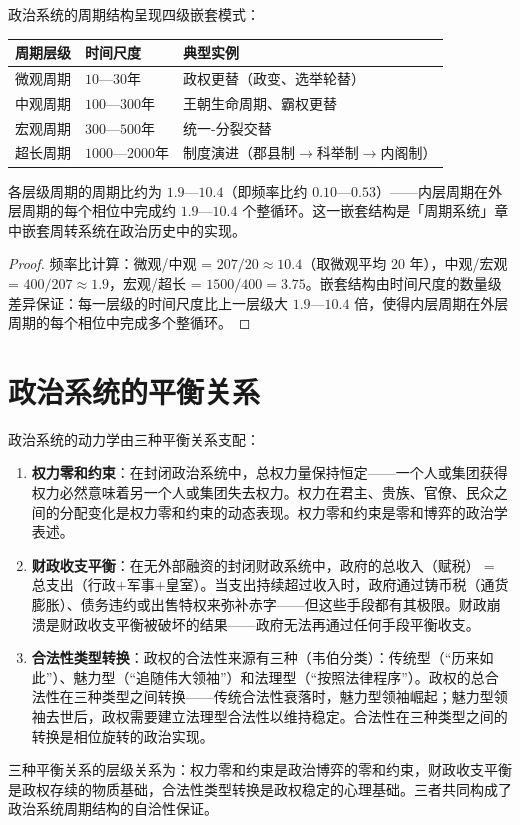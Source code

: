 \begin{theorem}[政治系统的嵌套周期结构]\label{thm:politics_nested_periods}
政治系统的周期结构呈现四级嵌套模式：
\begin{center}
\begin{tabular}{>{\centering\arraybackslash}p{3cm}>{\centering\arraybackslash}p{2.5cm}>{\centering\arraybackslash}p{4cm}}
\toprule
周期层级 & 时间尺度 & 典型实例 \\
\midrule
微观周期 & $10$—$30$年 & 政权更替（政变、选举轮替） \\
中观周期 & $100$—$300$年 & 王朝生命周期、霸权更替 \\
宏观周期 & $300$—$500$年 & 统一-分裂交替 \\
超长周期 & $1000$—$2000$年 & 制度演进（郡县制$\to$科举制$\to$内阁制） \\
\bottomrule
\end{tabular}
\end{center}
各层级周期的周期比约为 $1.9$—$10.4$（即频率比约 $0.10$—$0.53$）——内层周期在外层周期的每个相位中完成约 $1.9$—$10.4$ 个整循环。这一嵌套结构是「周期系统」章中嵌套周转系统在政治历史中的实现。
\end{theorem}

\begin{proof}
频率比计算：微观/中观 = $207/20\approx10.4$（取微观平均 $20$ 年），中观/宏观 = $400/207\approx1.9$，宏观/超长 = $1500/400=3.75$。嵌套结构由时间尺度的数量级差异保证：每一层级的时间尺度比上一层级大 $1.9$—$10.4$ 倍，使得内层周期在外层周期的每个相位中完成多个整循环。
\end{proof}

\section{政治系统的平衡关系}

\begin{theorem}[政治系统的三种平衡关系]\label{thm:political_conservation}
政治系统的动力学由三种平衡关系支配：
\begin{enumerate}[label=(\roman*)]
    \item \textbf{权力零和约束}：在封闭政治系统中，总权力量保持恒定——一个人或集团获得权力必然意味着另一个人或集团失去权力。权力在君主、贵族、官僚、民众之间的分配变化是权力零和约束的动态表现。权力零和约束是零和博弈的政治学表述。
    \item \textbf{财政收支平衡}：在无外部融资的封闭财政系统中，政府的总收入（赋税）$=$总支出（行政$+$军事$+$皇室）。当支出持续超过收入时，政府通过铸币税（通货膨胀）、债务违约或出售特权来弥补赤字——但这些手段都有其极限。财政崩溃是财政收支平衡被破坏的结果——政府无法再通过任何手段平衡收支。
    \item \textbf{合法性类型转换}：政权的合法性来源有三种（韦伯分类）：传统型（“历来如此”）、魅力型（“追随伟大领袖”）和法理型（“按照法律程序”）。政权的总合法性在三种类型之间转换——传统合法性衰落时，魅力型领袖崛起；魅力型领袖去世后，政权需要建立法理型合法性以维持稳定。合法性在三种类型之间的转换是相位旋转的政治实现。
\end{enumerate}
三种平衡关系的层级关系为：权力零和约束是政治博弈的零和约束，财政收支平衡是政权存续的物质基础，合法性类型转换是政权稳定的心理基础。三者共同构成了政治系统周期结构的自洽性保证。
\end{theorem}

